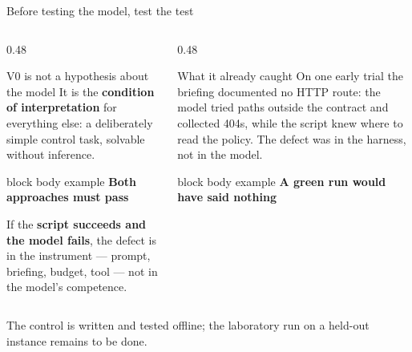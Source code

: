 \documentclass[aspectratio=169,10pt]{beamer}
\newcommand{\keymessage}[1]{%
  \begin{beamercolorbox}[rounded=true,sep=1.1ex,wd=\linewidth]{block body example}
    \centering\bfseries #1
  \end{beamercolorbox}
}
\begin{document}
\begin{frame}{Before testing the model, test the test}

  \begin{columns}[T,onlytextwidth]
    \begin{column}{0.48\textwidth}
      \begin{block}{V0 is not a hypothesis about the model}
        \small It is the \textbf{condition of interpretation} for everything
        else: a deliberately simple control task, solvable without inference.
      \end{block}
      \keymessage{Both approaches must pass}
      \vspace{0.4em}
      \small If the \textbf{script succeeds and the model fails}, the defect is
      in the instrument --- prompt, briefing, budget, tool --- not in the
      model's competence.
    \end{column}
    \begin{column}{0.48\textwidth}
      \begin{alertblock}{What it already caught}
        \small On one early trial the briefing documented no HTTP route: the
        model tried paths outside the contract and collected 404s, while the
        script knew where to read the policy. The defect was in the harness,
        not in the model.
      \end{alertblock}
      \keymessage{A green run would have said nothing}
    \end{column}
  \end{columns}

  \vspace{0.5em}
  \centering\scriptsize
  The control is written and tested offline; the laboratory run on a held-out
  instance remains to be done.

\end{frame}
\end{document}
